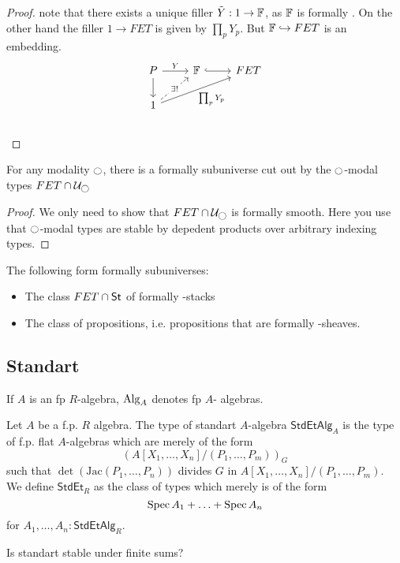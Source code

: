 \begin{proof}
	note that there exists a unique filler $\tilde Y : 1 \to \mathbb{F}$, as $\mathbb{F}$ is formally \etale. On the other hand the filler $1 \to FET$ is given by $\prod_p Y_p$. But $\mathbb{F} \hookrightarrow FET$ is an embedding.
	\[\begin{tikzcd}
		P & \bF & FET \\
		1
		\arrow["Y", from=1-1, to=1-2]
		\arrow[from=1-1, to=2-1]
		\arrow[hook, from=1-2, to=1-3]
		\arrow["{\exists!}"{description}, dashed, from=2-1, to=1-2]
		\arrow["{\prod_p Y_p}"', from=2-1, to=1-3]
	\end{tikzcd}\]\\
	
	
	
\end{proof}
\begin{prop}
	For any modality $\ci$, there is a formally \etale subuniverse cut out by the $\ci$-modal types $FET \cap \cU_{\ci}$
\end{prop}
\begin{proof}
	We only need to show that $FET \cap \cU_{\ci}$ is formally smooth. Here you use that $\ci$-modal types are stable by depedent products over arbitrary indexing types.
\end{proof}
\begin{example}{\label{lemma:FETSt}}
	The following form formally \etale subuniverses:
	\begin{itemize}
		\item 	The class $FET \cap \mathsf{St}$ of formally \etale \etale-stacks
		\item 	The class of \etale propositions, i.e. propositions that are formally \etale \etale-sheaves.
	\end{itemize}	
\end{example}

\subsection{Standart \etale}
If $A$ is an fp $R$-algebra, $\operatorname{Alg}_A$ denotes fp $A$- algebras.
\begin{definition}
	Let $A$ be a f.p. $R$ algebra. The type of standart \etale $A$-algebra $\mathsf{StdEtAlg}_A$ is the type of f.p. flat $A$-algebras which are merely of the form
	\[
	\left (A[X_1,\hdots,X_n] / (P_1,\hdots,P_m) \right)_G
	\]
	such that $\det (\mathrm{Jac}(P_1,\hdots,P_n))$ divides $G$ in $A[X_1,\hdots,X_n] / (P_1,\hdots,P_m) $. \\
	We define $\mathsf{StdEt}_R$ as the class of types which merely is of the form
	\[\operatorname{Spec} A_1 + \hdots + \operatorname{Spec} A_n\]
	for $A_1,\hdots,A_n : \mathsf{StdEtAlg}_R$.
\end{definition}
\begin{question}
	Is standart \etale stable under finite sums?
\end{question}


